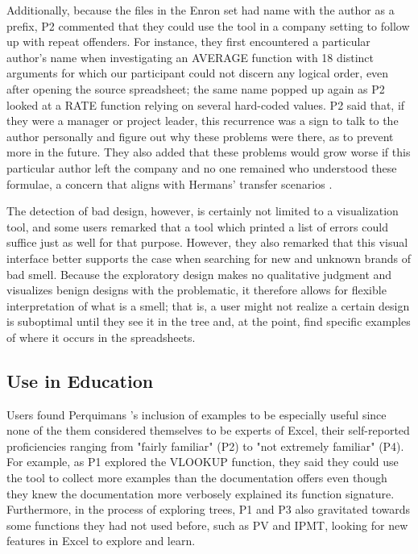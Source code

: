 \documentclass[conference]{IEEEtran}
\newcommand{\toolname}{Perquimans }
\begin{document}
	Additionally, because the files in the Enron set had name with the author as a
	prefix, P2 commented that they could use the tool in a company setting to
	follow up with repeat offenders. For instance, they first encountered a
	particular author's name when investigating an AVERAGE function with 18
	distinct arguments for which our participant could not discern any logical
	order, even after opening the source spreadsheet; the same name popped up again
	as P2 looked at a RATE function relying on several hard-coded values. P2 said
	that, if they were a manager or project leader, this recurrence was a sign to
	talk to the author personally and figure out why these problems were there, as
	to prevent more in the future. They also added that these problems would grow
	worse if this particular author left the company and no one remained who
	understood these formulae, a concern that aligns with Hermans' transfer
	scenarios \cite{hermans2011supporting}.
	
	The detection of bad design, however, is certainly not limited to a
	visualization tool, and some users remarked that a tool which printed a list of
	errors could suffice just as well for that purpose. However, they also remarked
	that this visual interface better supports the case when searching for new and
	unknown brands of bad smell. Because the exploratory design makes no
	qualitative judgment and visualizes benign designs with the problematic, it
	therefore allows for flexible interpretation of what is a smell; that is, a
	user might not realize a certain design is suboptimal until they see it in the
	tree and, at the point, find specific examples of where it occurs in the
	spreadsheets.
	
	\subsection{Use in Education} Users found \toolname's inclusion of examples to
	be especially useful since none of the them considered themselves to be experts
	of Excel, their self-reported proficiencies ranging from "fairly familiar" (P2)
	to "not extremely familiar" (P4). For example, as P1 explored the VLOOKUP
	function, they said they could use the tool to collect more examples than the
	documentation offers even though they knew the documentation more verbosely
	explained its function signature. Furthermore, in the process of exploring
	trees, P1 and P3 also gravitated towards some functions they had not used
	before, such as PV and IPMT, looking for new features in Excel to explore and
	learn. \par
	
\end{document}
